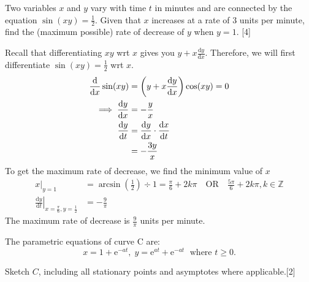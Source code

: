 \documentclass[12pt, a4 paper]{article}
\begin{document}
\begin{outline}[enumerate]
 \1 Two variables \(x\) and \(y\) vary with time \(t\) in minutes and are connected by the equation \(\sin (xy) = \frac{1}{2}\). Given that \(x\) increases at a rate of 3 units per minute, find the (maximum possible) rate of decrease of \(y\) when \(y = 1\). \hfill[4] %
 \begin{answer}
  Recall that differentiating \(xy\) wrt \(x\) gives you \(y+x\frac{\mathrm{d}y}{\mathrm{d}x}\). Therefore, we will first differentiate \(\sin (xy) = \frac{1}{2}\) wrt \(x\).
  \begin{align*}
   \frac{\mathrm{d}}{\mathrm{d}x}\sin (xy)  & = \left(y+x\frac{\mathrm{d}y}{\mathrm{d}x}\right)\cos(xy) = 0           \\
   \implies \frac{\mathrm{d}y}{\mathrm{d}x} & = -\frac{y}{x}                                                          \\\newline
   \frac{\mathrm{d}y}{\mathrm{d}t}          & = \frac{\mathrm{d}y}{\mathrm{d}x} \cdot \frac{\mathrm{d}x}{\mathrm{d}t} \\
                                            & = -\frac{3y}{x}                                                         \\
  \end{align*}
  To get the maximum rate of decrease, we find the minimum value of \(x\)
  \begin{align*}
   x|_{y=1}                                                                      & = \arcsin\left(\frac{1}{2}\right)\div 1 = \frac{\pi}{6} + 2k\pi \quad\textrm{OR}\quad \frac{5\pi}{6} + 2k\pi, k\in\mathbb{Z} \\
   \left.\frac{\mathrm{d}y}{\mathrm{d}t}\right|_{x=\frac{\pi}{6}, y=\frac{1}{2}} & = -\frac{9}{\pi}
  \end{align*}
  The maximum rate of decrease is \(\frac{9}{\pi}\) units per minute.
 \end{answer}

 \1 The parametric equations of curve C are: \[x = 1 + {\mathrm{e}^{ - at}},\;y = {\mathrm{e}^{at}} + {\mathrm{e}^{ - at}}\;{\textrm{ where }}t \geq 0.\] %

 \2  Sketch \(C\), including all stationary points and asymptotes where applicable.\hfill[2]
 \begin{answer}
  \color{black}
\end{answer}
\end{outline}
\end{document}
